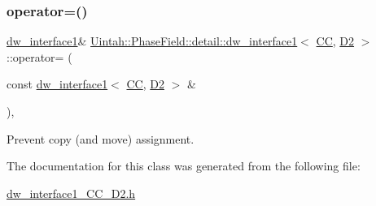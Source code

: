 \subsubsection{\texorpdfstring{operator=()}{operator=()}}
{\footnotesize\ttfamily \hyperlink{classUintah_1_1PhaseField_1_1detail_1_1dw__interface1}{dw\+\_\+interface1}\& \hyperlink{classUintah_1_1PhaseField_1_1detail_1_1dw__interface1}{Uintah\+::\+Phase\+Field\+::detail\+::dw\+\_\+interface1}$<$ \hyperlink{namespaceUintah_1_1PhaseField_a33d355affda78a83f45755ba8388cedda22303704507d024d1d6508ed9859a85a}{CC}, \hyperlink{namespaceUintah_1_1PhaseField_a12bfc68444894dffdf0cb8d9cf0cc76aa1a451dae278b0103a94105c8776e9a67}{D2} $>$\+::operator= (\begin{DoxyParamCaption}\item[{const \hyperlink{classUintah_1_1PhaseField_1_1detail_1_1dw__interface1}{dw\+\_\+interface1}$<$ \hyperlink{namespaceUintah_1_1PhaseField_a33d355affda78a83f45755ba8388cedda22303704507d024d1d6508ed9859a85a}{CC}, \hyperlink{namespaceUintah_1_1PhaseField_a12bfc68444894dffdf0cb8d9cf0cc76aa1a451dae278b0103a94105c8776e9a67}{D2} $>$ \&}]{ }\end{DoxyParamCaption})\hspace{0.3cm}{\ttfamily [protected]}, {\ttfamily [delete]}}



Prevent copy (and move) assignment. 



The documentation for this class was generated from the following file\+:\begin{DoxyCompactItemize}
\item 
\hyperlink{dw__interface1__CC__D2_8h}{dw\+\_\+interface1\+\_\+\+C\+C\+\_\+\+D2.\+h}\end{DoxyCompactItemize}
